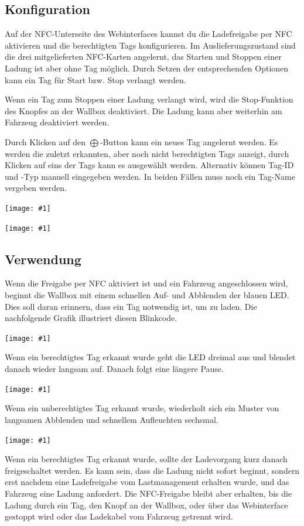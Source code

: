 \documentclass[a4paper,10pt]{article}
\newcommand{\hint}[1]{\begin{tcolorbox}[colback=boxgray,colframe=black,coltext=
white,title=Hinweis,left*=2mm,right*=2mm,boxsep=1mm,bottom=1mm,top=1mm]#1\end{tcolorbox}}
\newcommand{\gfx}[1]{\texttt{[image: \#1]}}
\begin{document}
\begin{multicols*}{2}
	\subsection{Konfiguration}
	Auf der NFC-Unterseite des Webinterfaces kannst du die Ladefreigabe per NFC aktivieren
	und die berechtigten Tags konfigurieren. Im Auslieferungszustand sind die
	drei mitgelieferten NFC-Karten angelernt, das Starten und Stoppen einer Ladung ist aber ohne Tag möglich.
	Durch Setzen der entsprechenden Optionen kann ein Tag für Start bzw. Stop verlangt werden.
	\hint{Wenn ein Tag zum Stoppen einer Ladung verlangt wird,
	wird die Stop-Funktion des Knopfes an der Wallbox deaktiviert.
	Die Ladung kann aber weiterhin am Fahrzeug deaktiviert werden.}


	Durch Klicken auf den $\bigoplus$-Button kann ein neues Tag angelernt werden.
	Es werden die zuletzt erkannten, aber noch nicht berechtigten Tags anzeigt,
	durch Klicken auf eins der Tags kann es ausgewählt werden. Alternativ können
	Tag-ID und -Typ manuell eingegeben werden. In beiden Fällen muss noch ein Tag-Name vergeben werden.

	\gfx{./img_warp2/resized/web_nfc}

	\gfx{./img_warp2/resized/web_nfc_new}

	\subsection{Verwendung}
	Wenn die Freigabe per NFC aktiviert ist und ein Fahrzeug angeschlossen wird,
	beginnt die Wallbox mit einem schnellen Auf- und Abblenden der blauen LED.
	Dies soll daran erinnern, dass ein Tag notwendig ist, um zu laden. Die
	nachfolgende Grafik illustriert diesen Blinkcode.

	\gfx{./img_warp2/resized/blink_nag}

	Wenn ein berechtigtes Tag erkannt wurde geht die LED
	dreimal aus und blendet danach wieder langsam auf. Danach folgt eine längere Pause.

	\gfx{./img_warp2/resized/blink_ack}

	Wenn ein unberechtigtes Tag erkannt wurde, wiederholt sich ein Muster von langsamen Abblenden
	und schnellem Aufleuchten sechsmal.

	\gfx{./img_warp2/resized/blink_nack}

	Wenn ein berechtigtes Tag erkannt wurde, sollte der Ladevorgang kurz danach
	freigeschaltet werden. Es kann sein, dass die Ladung nicht
	sofort beginnt, sondern erst nachdem eine Ladefreigabe vom Lastmanagement erhalten wurde,
	und das Fahrzeug eine Ladung anfordert. Die NFC-Freigabe bleibt aber erhalten,
	bis die Ladung durch ein Tag, den Knopf an der Wallbox, oder über das Webinterface gestoppt wird
	oder das Ladekabel vom Fahrzeug getrennt wird.


\end{multicols*}
\end{document}
